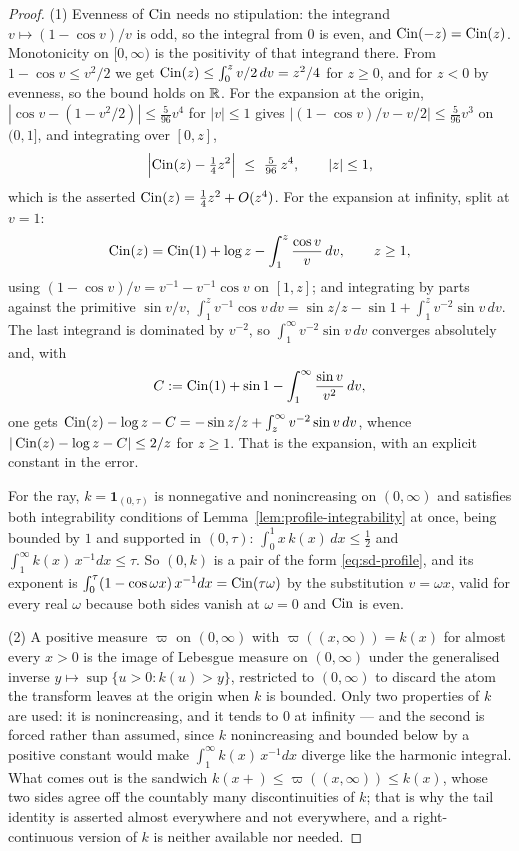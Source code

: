 \begin{proof}
(1) Evenness of $\operatorname{Cin}$ needs no stipulation: the integrand $v \mapsto (1 - \cos v)/v$ is odd,
so the integral from $0$ is even, and $\operatorname{Cin}(-z) = \operatorname{Cin}(z)$. Monotonicity on $[0,\infty)$ is the
positivity of that integrand there. From $1 - \cos v \le v^2/2$ we get
$\operatorname{Cin}(z) \le \int_0^z v/2\,dv = z^2/4$ for $z \ge 0$, and for $z < 0$ by evenness, so the bound
holds on $\mathbb{R}$. For the expansion at the origin, $|\cos v - (1 - v^2/2)| \le \tfrac{5}{96}v^4$
for $|v| \le 1$ gives $|(1-\cos v)/v - v/2| \le \tfrac{5}{96}v^3$ on $(0,1]$, and integrating
over $[0,z]$,
\[
  \Bigl|\Cin(z) - \tfrac14 z^2\Bigr| \ \le\ \tfrac{5}{96}\,z^4,
  \qquad |z| \le 1,
\]
which is the asserted $\operatorname{Cin}(z) = \tfrac14z^2 + O(z^4)$. For the expansion at infinity, split at
$v = 1$:
\[
  \operatorname{Cin}(z) = \operatorname{Cin}(1) + \log z - \int_1^z \frac{\cos v}{v}\,dv , \qquad z \ge 1,
\]
using $(1-\cos v)/v = v^{-1} - v^{-1}\cos v$ on $[1,z]$; and integrating by parts against the
primitive $\sin v/v$,
$\int_1^z v^{-1}\cos v\,dv = \sin z/z - \sin 1 + \int_1^z v^{-2}\sin v\,dv$. The last integrand
is dominated by $v^{-2}$, so $\int_1^\infty v^{-2}\sin v\,dv$ converges absolutely and, with
\[
  C := \operatorname{Cin}(1) + \sin 1 - \int_1^\infty \frac{\sin v}{v^2}\,dv ,
\]
one gets $\operatorname{Cin}(z) - \log z - C = -\sin z/z + \int_z^\infty v^{-2}\sin v\,dv$, whence
$|\operatorname{Cin}(z) - \log z - C| \le 2/z$ for $z \ge 1$. That is the expansion, with an explicit
constant in the error.

For the ray, $k = \mathbf 1_{(0,\tau)}$ is nonnegative and nonincreasing on $(0,\infty)$ and
satisfies both integrability conditions of Lemma~\ref{lem:profile-integrability} at once,
being bounded by $1$ and supported in $(0,\tau)$: $\int_0^1 x\,k(x)\,dx \le \tfrac12$ and
$\int_1^\infty k(x)\,x^{-1}dx \le \tau$. So $(0,k)$ is a pair of the form \ref{eq:sd-profile},
and its exponent is
$\int_0^\tau (1-\cos\omega x)\,x^{-1}dx = \operatorname{Cin}(\tau\omega)$ by the substitution $v = \omega x$,
valid for every real $\omega$ because both sides vanish at $\omega = 0$ and $\operatorname{Cin}$ is even.

(2) A positive measure $\varpi$ on $(0,\infty)$ with $\varpi((x,\infty)) = k(x)$ for almost
every $x > 0$ is the image of Lebesgue measure on $(0,\infty)$ under the generalised inverse
$y \mapsto \sup\{u > 0 : k(u) > y\}$, restricted to $(0,\infty)$ to discard the atom the
transform leaves at the origin when $k$ is bounded. Only two properties of $k$ are used: it is
nonincreasing, and it tends to $0$ at infinity --- and the second is forced rather than
assumed, since $k$ nonincreasing and bounded below by a positive constant would make
$\int_1^\infty k(x)\,x^{-1}dx$ diverge like the harmonic integral. What comes out is the
sandwich $k(x{+}) \le \varpi((x,\infty)) \le k(x)$, whose two sides agree off the countably
many discontinuities of $k$; that is why the tail identity is asserted almost everywhere and
not everywhere, and a right-continuous version of $k$ is neither available nor needed.


\end{proof}
